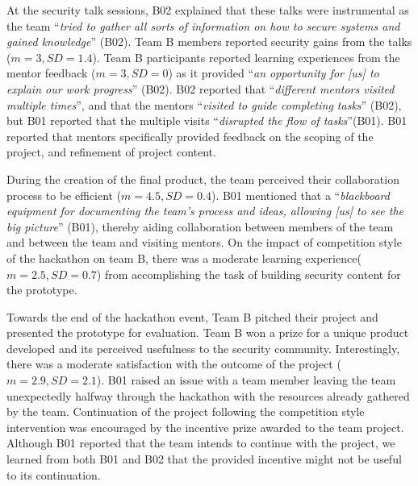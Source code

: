 \documentclass[runningheads]{llncs}
\begin{document}
At the security talk sessions, B02 explained that these talks were instrumental as the team ``\textit{tried to gather all sorts of information on how to secure systems and gained knowledge}'' (B02). Team B members reported security gains from the talks ($m = 3,SD=1.4$). Team B participants reported learning experiences from the mentor feedback ($m = 3,SD=0$) as it provided ``\textit{an opportunity for [us] to explain our work progress}'' (B02). 
B02 reported that ``\textit{different mentors visited multiple times}'', and that the mentors ``\textit{visited to guide completing tasks}'' (B02), but B01 reported that the multiple visits ``\textit{disrupted the flow of tasks}''(B01). B01 reported that mentors specifically provided feedback on the scoping of the project, and refinement of project content. %

During the creation of the final product, the team perceived their collaboration process to be efficient ($m=4.5, SD=0.4$). B01 mentioned that a ``\textit{blackboard equipment for documenting the team's process and ideas, allowing [us] to see the big picture}'' (B01), thereby aiding collaboration between members of the team and between the team and visiting mentors. 
On the impact of competition style of the hackathon on team B, there was a moderate learning experience($m = 2.5, SD=0.7$) from accomplishing the task of building security content for the prototype.

Towards the end of the hackathon event, Team B pitched their project and presented the prototype for evaluation. Team B won a prize for a unique product developed and its perceived usefulness to the security community. Interestingly, there was a moderate satisfaction with the outcome of the project ($m=2.9, SD=2.1$). 
B01 raised an issue with a team member leaving the team unexpectedly halfway through the hackathon with the resources already gathered by the team. Continuation of the project following the competition style intervention was encouraged by the incentive prize awarded to the team project. Although B01 reported that the team intends to continue with the project, we learned from both B01 and B02 that the provided incentive might not be useful to its continuation.
\end{document}
